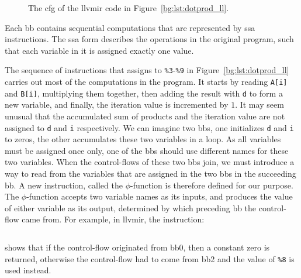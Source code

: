 \begin{figure}[ht]
    \centering
    \caption{%
        The \gls{cfg} of the \gls{llvmir} code in
        Figure~\ref{bg:lst:dotprod_ll}.
    }\label{bg:fig:dotprod_cfg}
\end{figure}

Each \gls{bb} contains sequential computations that are represented by
\gls{ssa} instructions.  The \gls{ssa} form describes the operations in the
original program, such that each variable in it is assigned exactly one value.

The sequence of instructions that assigns to \verb|%3|-\verb|%9| in
Figure~\ref{bg:lst:dotprod_ll} carries out most of the computations in the
program.  It starts by reading \verb|A[i]| and \verb|B[i]|, multiplying them
together, then adding the result with \verb|d| to form a new variable, and
finally, the iteration value is incremented by $1$.  It may seem unusual that
the accumulated sum of products and the iteration value are not assigned
to \verb|d| and \verb|i| respectively.  We can imagine two \glspl{bb}, one
initializes \verb|d| and \verb|i| to zeros, the other accumulates these two
variables in a loop.  As all variables must be assigned once only, one of
the \glspl{bb} should use different names for these two variables.  When the
control-flows of these two \glspl{bb} join, we must introduce a way to read
from the variables that are assigned in the two \glspl{bb} in the succeeding
\gls{bb}\@.  A new instruction, called the $\phi$-function is therefore defined
for our purpose.  The $\phi$-function accepts two variable names as its inputs,
and produces the value of either variable as its output, determined by which
preceding \gls{bb} the control-flow came from.  For example, in \gls{llvmir},
the instruction:
\begin{lstlisting}[language=LLVM]
    %d.01 = phi float [ 0.000000e+00, %0 ], [ %8, %2 ]
\end{lstlisting}\vspace{-15pt}
shows that if the control-flow originated from \gls{bb}0, then a constant zero
is returned, otherwise the control-flow had to come from \gls{bb}2 and the
value of \verb|%8| is used instead.

